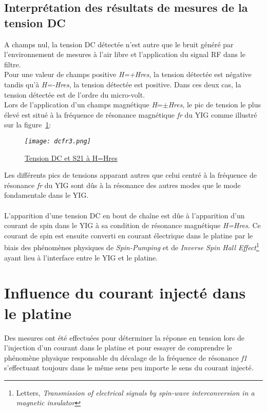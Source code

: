 \documentclass[12pt,fleqn]{book} %
\begin{document}
\section{Interprétation des résultats de mesures de la tension DC}
\noindent A champs nul, la tension DC détectée n'est autre que le bruit généré par l'environnement de mesures à l'air libre et l'application du signal RF dans le filtre.
~\\Pour une valeur de champs positive \emph{H=+Hres}, la tension détectée est négative tandis qu'à \emph{H=-Hres}, la tension détectée est positive. Dans ces deux cas, la tension détectée est de l'ordre du micro-volt.
~\\Lors de l'application d'un champs magnétique \emph{H}=$\pm$\emph{Hres}, le pic de tension le plus élevé est situé à la fréquence de résonance magnétique \emph{fr} du YIG comme illustré sur la figure~\underline{\color{blue}\ref{dcfr}}:
\begin{figure}[H]
	\centering
	\itshape
	\texttt{[image: dcfr3.png]}
	\caption{\label{dcfr} \underline{Tension DC et S21 à H=Hres}}
\end{figure}
\noindent Les différents pics de tensions apparant autres que celui centré à la fréquence de résonance \emph{fr} du YIG sont dûs à la résonance des autres modes que le mode fondamentale dans le YIG. 
~\\\\L'apparition d'une tension DC en bout de chaîne est dûe à l'apparition d'un courant de spin dans le YIG à sa condition de résonance magnétique \emph{H=Hres}. Ce courant de spin est ensuite converti en courant électrique dans le platine par le biais des phénomènes physiques de \emph{Spin-Pumping} et de \emph{Inverse Spin Hall Effect}\footnote{Letters, \emph{Transmission of electrical signals by spin-wave interconversion in a magnetic insulator}} ayant lieu à l'interface entre le YIG et le platine.
\chapter{Influence du courant injecté dans le platine}
Des mesures ont été effectuées pour déterminer la réponse en tension lors de l'injection d'un courant dans le platine et pour essayer de comprendre le phénomène physique responsable du décalage de la fréquence de résonance \emph{f1} s'effectuant toujours dans le même sens peu importe le sens du courant injecté. 
\end{document}

